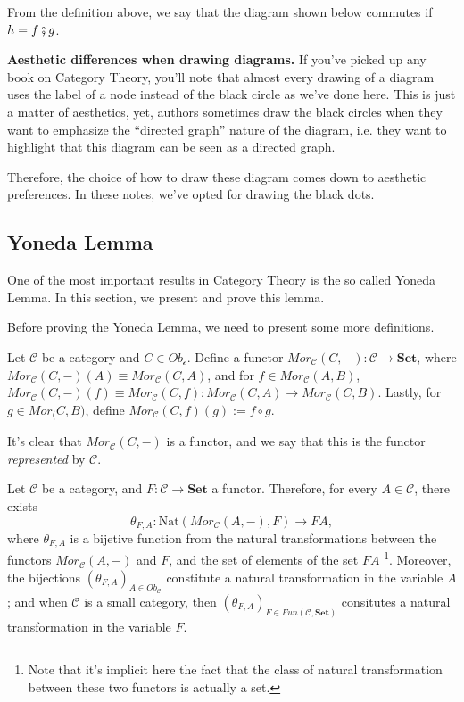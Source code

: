From the definition above, we say that the diagram shown below commutes
if $h = f \fatsemi g$.

\begin{shaded}
  \textbf{Aesthetic differences when drawing diagrams.}
  If you've picked up any book on Category Theory, you'll note that almost every
  drawing of a diagram uses the label of a node instead of the black circle
  as we've done here. This is just a matter of aesthetics, yet, authors
  sometimes draw the black circles when they want to emphasize the
  ``directed graph'' nature of the diagram, i.e. they want to highlight
  that this diagram can be seen as a directed graph.

  Therefore, the choice of how to draw these diagram comes down to
  aesthetic preferences. In these notes, we've opted for drawing the
  black dots.
\end{shaded}

\subsection{Yoneda Lemma}

One of the most important results in Category Theory is the so called Yoneda Lemma.
In this section, we present and prove this lemma.

Before proving the Yoneda Lemma, we need to present some more definitions.

\begin{definition}
  Let $\mathcal C$ be a category and $C \in Ob_\mathcal c$.
  Define a functor $Mor_\mathcal C(C,-): \mathcal C \to \mathbf{Set}$,
  where $Mor_\mathcal C (C,-)(A) \equiv Mor_\mathcal C (C,A)$, and
  for $ f \in Mor_\mathcal C (A,B)$,
  $Mor_\mathcal C (C, -)(f) \equiv Mor_\mathcal C(C,f) : Mor_\mathcal C(C,A) \to Mor_\mathcal C(C,B)$.
  Lastly, for $g \in Mor_\mathcal (C, B)$, define $Mor_\mathcal C(C,f) (g) := f \circ g$.

  It's clear that $Mor_\mathcal C(C,-)$ is a functor, and we say that this is the functor
  \textit{represented} by $\mathcal C$.
\end{definition}

\begin{lemma}
  Let $\mathcal C$ be a category, and $F:\mathcal C \to \mathbf{Set}$ a functor.
  Therefore, for every $A \in \mathcal C$, there exists
  \begin{displaymath}
    \theta_{F,A}: \text{Nat}(Mor_\mathcal C (A, -), F) \to FA,
  \end{displaymath}
  where $\theta_{F,A}$ is a bijetive function from the natural transformations
  between the functors $Mor_\mathcal C (A, -)$ and $F$, and the set of elements of the set $FA$
  \footnote{Note that it's implicit here the fact that the class of natural transformation between
  these two functors is actually a set.}.
  Moreover, the bijections $(\theta_{F,A})_{A \in Ob_\mathcal C}$ constitute a natural transformation
  in the variable $A$; and when $\mathcal C$ is a small category,
  then $(\theta_{F,A})_{F \in Fun(\mathcal C, \mathbf{Set})}$
  consitutes a natural transformation in the variable $F$.
\end{lemma}

